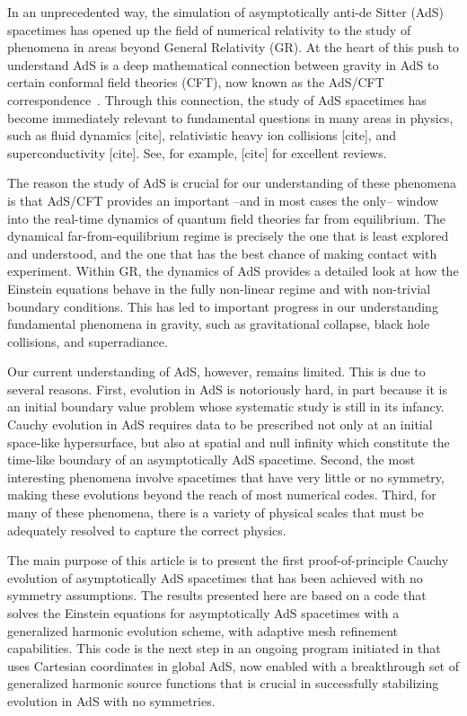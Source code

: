\documentclass[12pt]{iopart} %
\begin{document}
In an unprecedented way, the simulation of asymptotically anti-de Sitter (AdS) spacetimes has opened up the field of numerical relativity to the study of phenomena in areas beyond General Relativity (GR). 
At the heart of this push to understand AdS is a deep mathematical connection between gravity in AdS to certain conformal field theories (CFT), now known as the AdS/CFT correspondence~\cite{Maldacena:1997re,Gubser:1998bc,Witten:1998qj}. 
Through this connection, the study of AdS spacetimes has become immediately relevant to fundamental questions in many areas in physics, such as fluid dynamics [cite], relativistic heavy ion collisions [cite], and superconductivity [cite].
See, for example, [cite] for excellent reviews. 

The reason the study of AdS is crucial for our understanding of these phenomena is that AdS/CFT provides an important --and in most cases the only-- window into the real-time dynamics of quantum field theories far from equilibrium. 
The dynamical far-from-equilibrium regime is precisely the one that is least explored and understood, and the one that has the best chance of making contact with experiment.
Within GR, the dynamics of AdS provides a detailed look at how the Einstein equations behave in the fully non-linear regime and with non-trivial boundary conditions.
This has led to important progress in our understanding fundamental phenomena in gravity, such as gravitational collapse, black hole collisions, and superradiance. 

Our current understanding of AdS, however, remains limited. 
This is due to several reasons.
First, evolution in AdS is notoriously hard, in part because it is an initial boundary value problem whose systematic study is still in its infancy. 
Cauchy evolution in AdS requires data to be prescribed not only at an initial space-like hypersurface, but also at spatial and null infinity which constitute the time-like boundary of an asymptotically AdS spacetime.
Second, the most interesting phenomena involve spacetimes that have very little or no symmetry, making these evolutions beyond the reach of most numerical codes. 
Third, for many of these phenomena, there is a variety of physical scales that must be adequately resolved to capture the correct physics.

The main purpose of this article is to present the first proof-of-principle Cauchy evolution of asymptotically AdS spacetimes that has been achieved with no symmetry assumptions.
The results presented here are based on a code that solves the Einstein equations for asymptotically AdS spacetimes with a generalized harmonic evolution scheme, with adaptive mesh refinement capabilities. 
This code is the next step in an ongoing program initiated in \cite{Bantilan:2017kok} that uses Cartesian coordinates in global AdS, now enabled with a breakthrough set of generalized harmonic source functions that is crucial in successfully stabilizing evolution in AdS with no symmetries.
\end{document}
